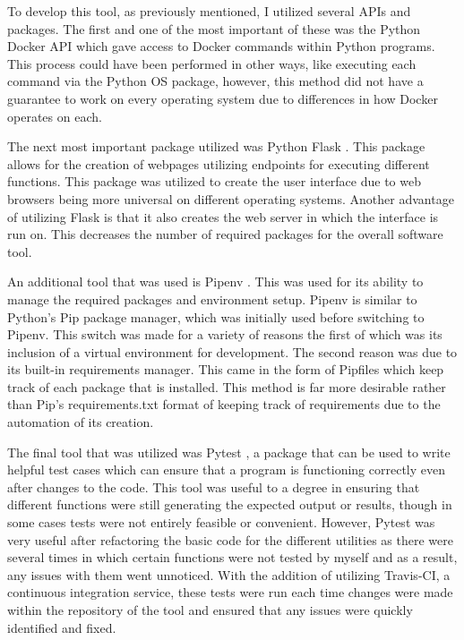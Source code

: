 To develop this tool, as previously mentioned, I utilized several APIs and packages. The first and one of the most important of these was the Python Docker API which gave access to Docker commands within Python programs. This process could have been performed in other ways, like executing each command via the Python OS package, however, this method did not have a guarantee to work on every operating system due to differences in how Docker operates on each.

The next most important package utilized was Python Flask \cite{flask}. This package allows for the creation of webpages utilizing endpoints for executing different functions. This package was utilized to create the user interface due to web browsers being more universal on different operating systems. Another advantage of utilizing Flask is that it also creates the web server in which the interface is run on. This decreases the number of required packages for the overall software tool.

An additional tool that was used is Pipenv \cite{pipenv}. This was used for its ability to manage the required packages and environment setup. Pipenv is similar to Python's Pip package manager, which was initially used before switching to Pipenv. This switch was made for a variety of reasons the first of which was its inclusion of a virtual environment for development. The second reason was due to its built-in requirements manager. This came in the form of Pipfiles which keep track of each package that is installed. This method is far more desirable rather than Pip's requirements.txt format of keeping track of requirements due to the automation of its creation.

The final tool that was utilized was Pytest \cite{pytest}, a package that can be used to write helpful test cases which can ensure that a program is functioning correctly even after changes to the code. This tool was useful to a degree in ensuring that different functions were still generating the expected output or results, though in some cases tests were not entirely feasible or convenient. However, Pytest was very useful after refactoring the basic code for the different utilities as there were several times in which certain functions were not tested by myself and as a result, any issues with them went unnoticed. With the addition of utilizing Travis-CI, a continuous integration service, these tests were run each time changes were made within the repository of the tool and ensured that any issues were quickly identified and fixed.

